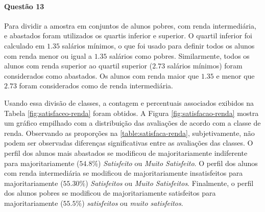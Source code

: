 \documentclass[10pt,a4paper,oneside]{article}
\begin{document}

\FloatBarrier

\paragraph{Questão 13}


Para dividir a amostra em conjuntos de alunos pobres, com renda intermediária, e abastados foram utilizados os quartis inferior e superior. O quartil inferior foi calculado em $1.35$ salários mínimos, o que foi usado para definir todos os alunos com renda menor ou igual a $1.35$ salários como pobres. Similarmente, todos os alunos com renda superior ao quartil superior ($2.73$ salários mínimos) foram considerados como abastados. Os alunos com renda maior que $1.35$ e menor que $2.73$ foram considerados como de renda intermediária.

Usando essa divisão de classes, a contagem e percentuais associados exibidos na Tabela \ref{fig:satisfaceo-renda} foram obtidos. A Figura \ref{fig:satisfacao-renda} mostra um gráfico empilhado com a distribuição das avaliações de acordo com a classe de renda. Observando as proporções na \ref{table:satisfaca-renda}, subjetivamente, não podem ser observadas diferenças significativas entre as avaliações das classes. O perfil dos alunos mais abastados se modificou de majoritariamente indiferente para majoritariamente ($54.8\%$) \textit{Satisfeito} ou \textit{Muito Satisfeito}. O perfil dos alunos com renda intermediária se modificou de majoritariamente insatisfeitos para majoritariamente ($55.30\%$) \textit{Satisfeitos} ou \textit{Muito Satisfeitos}. Finalmente, o perfil dos alunos pobres se modificou de majoritariamente satisfeitos para majoritariamente ($55.5\%$) \textit{satisfeitos} ou \textit{muito satisfeitos}.
\end{document}
